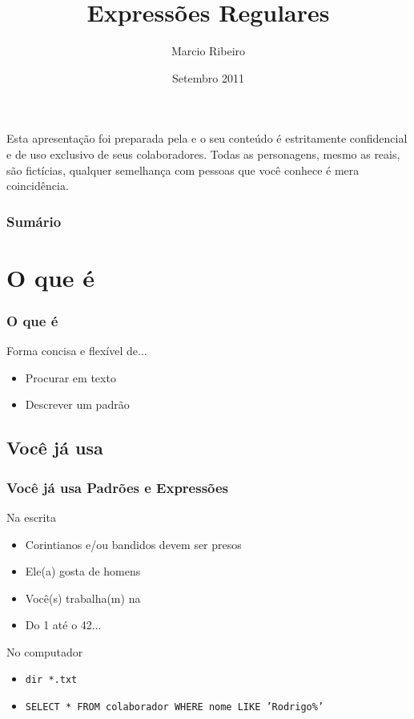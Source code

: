 \documentclass{beamer}
\title{Expressões Regulares}
\author{Marcio Ribeiro}
\date{Setembro 2011}
\begin{document}
\begin{frame}
 \titlepage
 {\tiny
  Esta apresentação foi preparada pela   e o seu conteúdo é
  estritamente confidencial e de uso exclusivo de seus colaboradores.
  Todas as personagens, mesmo as reais, são fictícias, qualquer semelhança com
  pessoas que você conhece é mera coincidência.
 }
\end{frame}

\begin{frame}
 \frametitle{Sumário}
 \tableofcontents
\end{frame}

\section{O que é}
\begin{frame}
 \frametitle{O que é}
  \begin{block}{Forma concisa e flexível de...}
  \begin{itemize}
   \item Procurar em texto
   \item Descrever um padrão
  \end{itemize}
 \end{block}
\end{frame}

\subsection{Você já usa}
\begin{frame}
 \frametitle{Você já usa Padrões e Expressões}
 \begin{block}{Na escrita}
  \begin{itemize}
   \item Corintianos e/ou bandidos devem ser presos
	\pause
   \item Ele(a) gosta de homens
	\pause
   \item Você(s) trabalha(m) na 
	\pause
   \item Do 1 até o 42...
  \end{itemize}
 \end{block}

 \pause
 \begin{block}{No computador}
  \begin{itemize}
   \item \texttt{dir *.txt}
	\pause
   \item {\small \texttt{SELECT * FROM colaborador WHERE nome LIKE 'Rodrigo\%'}}
  \end{itemize}
 \end{block}
\end{frame}
\end{document}
